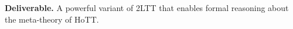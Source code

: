 \documentclass[a4paper,11pt]{article}
\renewcommand{\paragraph}[1]{\textbf{#1.}}
\begin{document}


\paragraph{Deliverable}
A powerful variant of 2LTT that enables formal reasoning about the meta-theory of HoTT.
%
%



%

%
\end{document}
